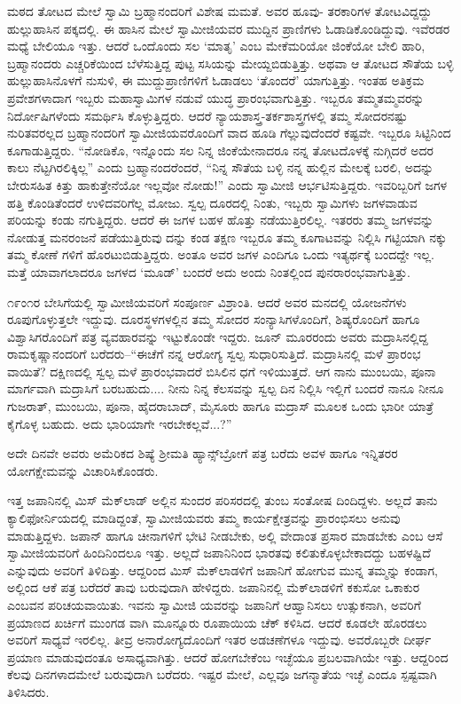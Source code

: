ಮಠದ ತೋಟದ ಮೇಲೆ ಸ್ವಾಮಿ ಬ್ರಹ್ಮಾನಂದರಿಗೆ ವಿಶೇಷ ಮಮತೆ. ಅವರ ಹೂವು- ತರಕಾರಿಗಳ ತೋಟವಿದ್ದದ್ದು ಹುಲ್ಲುಹಾಸಿನ ಪಕ್ಕದಲ್ಲಿ. ಈ ಹಾಸಿನ ಮೇಲೆ ಸ್ವಾಮೀಜಿಯವರ ಮುದ್ದಿನ ಪ್ರಾಣಿಗಳು ಓಡಾಡಿಕೊಂಡಿದ್ದುವು. ಇವೆರಡರ ಮಧ್ಯೆ ಬೇಲಿಯೂ ಇತ್ತು. ಆದರೆ ಒಂದೊಂದು ಸಲ ‘ಮಾತೃ’ ಎಂಬ ಮೇಕೆಮರಿಯೋ ಜಿಂಕೆಯೋ ಬೇಲಿ ಹಾರಿ, ಬ್ರಹ್ಮಾನಂದರು ಎಚ್ಚರಿಕೆಯಿಂದ ಬೆಳೆಸುತ್ತಿದ್ದ ಪುಟ್ಟ ಸಸಿಯನ್ನು ಮೇಯ್ದಬಿಡುತ್ತಿತ್ತು. ಅಥವಾ ಆ ತೋಟದ ಸೌತೆಯ ಬಳ್ಳಿ ಹುಲ್ಲುಹಾಸಿನೊಳಗೆ ನುಸುಳಿ, ಈ ಮುದ್ದುಪ್ರಾಣಿಗಳಿಗೆ ಓಡಾಡಲು ‘ತೊಂದರೆ’ ಯಾಗುತ್ತಿತ್ತು. ಇಂತಹ ಅತಿಕ್ರಮ ಪ್ರವೇಶಗಳಾದಾಗ ಇಬ್ಬರು ಮಹಾಸ್ವಾಮಿಗಳ ನಡುವೆ ಯುದ್ಧ ಪ್ರಾರಂಭವಾಗುತ್ತಿತ್ತು. ಇಬ್ಬರೂ ತಮ್ಮತಮ್ಮವರನ್ನು ನಿರ್ದೋಷಿಗಳೆಂದು ಸಮರ್ಥಿಸಿ ಕೊಳ್ಳುತ್ತಿದ್ದರು. ಆದರೆ ನ್ಯಾಯಶಾಸ್ತ್ರ-ತರ್ಕಶಾಸ್ತ್ರಗಳಲ್ಲಿ ತಮ್ಮ ಸೋದರನಷ್ಟು ನುರಿತವರಲ್ಲದ ಬ್ರಹ್ಮಾನಂದರಿಗೆ ಸ್ವಾಮೀಜಿಯವರೊಂದಿಗೆ ವಾದ ಹೂಡಿ ಗೆಲ್ಲುವುದೆಂದರೆ ಕಷ್ಟವೇ. ಇಬ್ಬರೂ ಸಿಟ್ಟಿನಿಂದ ಕೂಗಾಡುತ್ತಿದ್ದರು. “ನೋಡಿಕೊ, ಇನ್ನೊಂದು ಸಲ ನಿನ್ನ ಜಿಂಕೆಯೇನಾದರೂ ನನ್ನ ತೋಟದೊಳಕ್ಕೆ ನುಗ್ಗಿದರೆ ಅದರ ಕಾಲು ನೆಟ್ಟಗಿರಲಿಕ್ಕಿಲ್ಲ” ಎಂದು ಬ್ರಹ್ಮಾನಂದರೆಂದರೆ, “ನಿನ್ನ ಸೌತೆಯ ಬಳ್ಳಿ ನನ್ನ ಹುಲ್ಲಿನ ಮೇಲಕ್ಕೆ ಬರಲಿ, ಅದನ್ನು ಬೇರುಸಹಿತ ಕಿತ್ತು ಹಾಕುತ್ತೇನೆಯೋ ಇಲ್ಲವೋ ನೋಡು!” ಎಂದು ಸ್ವಾಮೀಜಿ ಆರ್ಭಟಿಸುತ್ತಿದ್ದರು. ಇವರಿಬ್ಬರಿಗೆ ಜಗಳ ಹತ್ತಿ ಕೊಂಡಿತೆಂದರೆ ಉಳಿದವರಿಗೆಲ್ಲ ಮೋಜು. ಸ್ವಲ್ಪ ದೂರದಲ್ಲಿ ನಿಂತು, ಇಬ್ಬರು ಸ್ವಾಮಿಗಳು ಜಗಳವಾಡುವ ಪರಿಯನ್ನು ಕಂಡು ನಗುತ್ತಿದ್ದರು. ಆದರೆ ಈ ಜಗಳ ಬಹಳ ಹೊತ್ತು ನಡೆಯುತ್ತಿರಲಿಲ್ಲ. ಇತರರು ತಮ್ಮ ಜಗಳವನ್ನು ನೋಡುತ್ತ ಮನರಂಜನೆ ಪಡೆಯುತ್ತಿರುವು ದನ್ನು ಕಂಡ ತಕ್ಷಣ ಇಬ್ಬರೂ ತಮ್ಮ ಕೂಗಾಟವನ್ನು ನಿಲ್ಲಿಸಿ ಗಟ್ಟಿಯಾಗಿ ನಕ್ಕು ತಮ್ಮ ಕೋಣೆ ಗಳಿಗೆ ಹೊರಟುಬಿಡುತ್ತಿದ್ದರು. ಅಂತೂ ಅವರ ಜಗಳ ಎಂದಿಗೂ ಒಂದು ಇತ್ಯರ್ಥಕ್ಕೆ ಬಂದದ್ದೇ ಇಲ್ಲ. ಮತ್ತೆ ಯಾವಾಗಲಾದರೂ ಜಗಳದ ‘ಮೂಡ್​’ ಬಂದರೆ ಅದು ಅಂದು ನಿಂತಲ್ಲಿಂದ ಪುನರಾರಂಭವಾಗುತ್ತಿತ್ತು.

೧೯ಂ೧ರ ಬೇಸಿಗೆಯಲ್ಲಿ ಸ್ವಾಮೀಜಿಯವರಿಗೆ ಸಂಪೂರ್ಣ ವಿಶ್ರಾಂತಿ. ಆದರೆ ಅವರ ಮನದಲ್ಲಿ ಯೋಜನೆಗಳು ರೂಪುಗೊಳ್ಳುತ್ತಲೇ ಇದ್ದುವು. ದೂರಸ್ಥಳಗಳಲ್ಲಿನ ತಮ್ಮ ಸೋದರ ಸಂನ್ಯಾಸಿಗಳೊಂದಿಗೆ, ಶಿಷ್ಯರೊಂದಿಗೆ ಹಾಗೂ ವಿಶ್ವಾಸಿಗರೊಂದಿಗೆ ಪತ್ರ ವ್ಯವಹಾರವನ್ನು ಇಟ್ಟುಕೊಂಡೇ ಇದ್ದರು. ಜೂನ್ ಮೂರರಂದು ಅವರು ಮದ್ರಾಸಿನಲ್ಲಿದ್ದ ರಾಮಕೃಷ್ಣಾನಂದರಿಗೆ ಬರೆದರು–“ಈಚೆಗೆ ನನ್ನ ಆರೋಗ್ಯ ಸ್ವಲ್ಪ ಸುಧಾರಿಸುತ್ತಿದೆ. ಮದ್ರಾಸಿನಲ್ಲಿ ಮಳೆ ಪ್ರಾರಂಭ ವಾಯಿತೆ? ದಕ್ಷಿಣದಲ್ಲಿ ಸ್ವಲ್ಪ ಮಳೆ ಪ್ರಾರಂಭವಾದರೆ ಬಿಸಿಲಿನ ಧಗೆ ಇಳಿಯುತ್ತದೆ. ಆಗ ನಾನು ಮುಂಬಯಿ, ಪೂನಾ ಮಾರ್ಗವಾಗಿ ಮದ್ರಾಸಿಗೆ ಬರಬಹುದು.... ನೀನು ನಿನ್ನ ಕೆಲಸವನ್ನು ಸ್ವಲ್ಪ ದಿನ ನಿಲ್ಲಿಸಿ ಇಲ್ಲಿಗೆ ಬಂದರೆ ನಾನೂ ನೀನೂ ಗುಜರಾತ್, ಮುಂಬಯಿ, ಪೂನಾ, ಹೈದರಾಬಾದ್, ಮೈಸೂರು ಹಾಗೂ ಮದ್ರಾಸ್ ಮೂಲಕ ಒಂದು ಭಾರೀ ಯಾತ್ರೆ ಕೈಗೊಳ್ಳ ಬಹುದು. ಅದು ಭಾರಿಯಾಗೇ ಇರಬೇಕಲ್ಲವೆ...?”

ಅದೇ ದಿನವೇ ಅವರು ಅಮೆರಿಕದ ಶಿಷ್ಯೆ ಶ್ರೀಮತಿ ಹ್ಯಾನ್ಸ್​ಬ್ರೋಗೆ ಪತ್ರ ಬರೆದು ಅವಳ ಹಾಗೂ ಇನ್ನಿತರರ ಯೋಗಕ್ಷೇಮವನ್ನು ವಿಚಾರಿಸಿಕೊಂಡರು.

ಇತ್ತ ಜಪಾನಿನಲ್ಲಿ ಮಿಸ್ ಮೆಕ್​ಲಾಡ್ ಅಲ್ಲಿನ ಸುಂದರ ಪರಿಸರದಲ್ಲಿ ತುಂಬ ಸಂತೋಷ ದಿಂದಿದ್ದಳು. ಅಲ್ಲದೆ ತಾನು ಕ್ಯಾಲಿಫೋರ್ನಿಯದಲ್ಲಿ ಮಾಡಿದ್ದಂತೆ, ಸ್ವಾಮೀಜಿಯವರು ತಮ್ಮ ಕಾರ್ಯಕ್ಷೇತ್ರವನ್ನು ಪ್ರಾರಂಭಿಸಲು ಅನುವು ಮಾಡುತ್ತಿದ್ದಳು. ಜಪಾನ್ ಹಾಗೂ ಚೀನಾಗಳಿಗೆ ಭೇಟಿ ನೀಡಬೇಕು, ಅಲ್ಲಿ ವೇದಾಂತ ಪ್ರಸಾರ ಮಾಡಬೇಕು ಎಂಬ ಆಸೆ ಸ್ವಾಮೀಜಿಯವರಿಗೆ ಹಿಂದಿನಿಂದಲೂ ಇತ್ತು. ಅಲ್ಲದೆ ಜಪಾನಿನಿಂದ ಭಾರತವು ಕಲಿತುಕೊಳ್ಳಬೇಕಾದದ್ದು ಬಹಳಷ್ಟಿದೆ ಎನ್ನುವುದು ಅವರಿಗೆ ತಿಳಿದಿತ್ತು. ಆದ್ದರಿಂದ ಮಿಸ್ ಮೆಕ್​ಲಾಡಳಿಗೆ ಜಪಾನಿಗೆ ಹೋಗುವ ಮುನ್ನ ತಮ್ಮನ್ನು ಕಂಡಾಗ, ಅಲ್ಲಿಂದ ಆಕೆ ಪತ್ರ ಬರೆದರೆ ತಾವು ಬರುವುದಾಗಿ ಹೇಳಿದ್ದರು. ಜಪಾನಿನಲ್ಲಿ ಮೆಕ್​ಲಾಡಳಿಗೆ ಕಕುಸೋ ಒಕಾಕುರ ಎಂಬವನ ಪರಿಚಯವಾಯಿತು. ಇವನು ಸ್ವಾಮೀಜಿ ಯವರನ್ನು ಜಪಾನಿಗೆ ಆಹ್ವಾನಿಸಲು ಉತ್ಸುಕನಾಗಿ, ಅವರಿಗೆ ಪ್ರಯಾಣದ ಖರ್ಚಿಗೆ ಮುಂಗಡ ವಾಗಿ ಮೂನ್ನೂರು ರೂಪಾಯಿಯ ಚೆಕ್ ಕಳಿಸಿದ. ಆದರೆ ಕೂಡಲೇ ಹೊರಡಲು ಅವರಿಗೆ ಸಾಧ್ಯವೆ ಇರಲಿಲ್ಲ. ತೀವ್ರ ಅನಾರೋಗ್ಯದೊಂದಿಗೆ ಇತರ ಅಡಚಣೆಗಳೂ ಇದ್ದುವು. ಅವರೊಬ್ಬರೇ ದೀರ್ಘ ಪ್ರಯಾಣ ಮಾಡುವುದಂತೂ ಅಸಾಧ್ಯವಾಗಿತ್ತು. ಆದರೆ ಹೋಗಬೇಕೆಂಬ ಇಚ್ಛೆಯೂ ಪ್ರಬಲವಾಗಿಯೇ ಇತ್ತು. ಆದ್ದರಿಂದ ಕೆಲವು ದಿನಗಳಾದಮೇಲೆ ಬರುವುದಾಗಿ ಬರೆದರು. ಇಷ್ಟರ ಮೇಲೆ, ಎಲ್ಲವೂ ಜಗನ್ಮಾತೆಯ ಇಚ್ಛೆ ಎಂದೂ ಸ್ಪಷ್ಟವಾಗಿ ತಿಳಿಸಿದರು.

